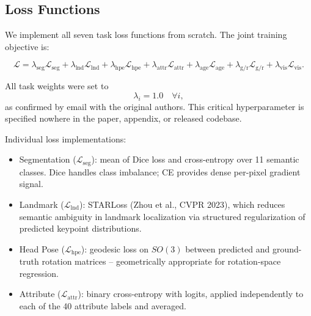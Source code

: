 \documentclass[11pt]{article}
\newenvironment{keybox}[1]{\begin{tcolorbox}[colback=facexlight,colframe=facexteal,title=#1,fonttitle=\bfseries,arc=1mm,boxrule=0.5pt]}{\end{tcolorbox}}
\begin{document}
\subsection{Loss Functions}

We implement all seven task loss functions from scratch. The joint training objective is:

\begin{equation}
\mathcal{L}
= \lambda_{\mathrm{seg}}\mathcal{L}_{\mathrm{seg}}
+ \lambda_{\mathrm{lnd}}\mathcal{L}_{\mathrm{lnd}}
+ \lambda_{\mathrm{hpe}}\mathcal{L}_{\mathrm{hpe}}
+ \lambda_{\mathrm{attr}}\mathcal{L}_{\mathrm{attr}}
+ \lambda_{\mathrm{age}}\mathcal{L}_{\mathrm{age}}
+ \lambda_{\mathrm{g/r}}\mathcal{L}_{\mathrm{g/r}}
+ \lambda_{\mathrm{vis}}\mathcal{L}_{\mathrm{vis}} .
\end{equation}

\begin{keybox}{Key Finding}
All task weights were set to
\[
\lambda_i = 1.0 \quad \forall i ,
\]
as confirmed by email with the original authors. This critical hyperparameter is specified nowhere in the paper, appendix, or released codebase.
\end{keybox}

Individual loss implementations:

\begin{itemize}\item Segmentation ($\mathcal{L}_{\mathrm{seg}}$): mean of Dice loss and cross-entropy over 11 semantic classes. Dice handles class imbalance; CE provides dense per-pixel gradient signal.\end{itemize}

\begin{itemize}\item Landmark ($\mathcal{L}_{\mathrm{lnd}}$): STARLoss (Zhou et al., CVPR 2023), which reduces semantic ambiguity in landmark localization via structured regularization of predicted keypoint distributions.\end{itemize}

\begin{itemize}\item Head Pose ($\mathcal{L}_{\mathrm{hpe}}$): geodesic loss on $SO(3)$ between predicted and ground-truth rotation matrices -- geometrically appropriate for rotation-space regression.\end{itemize}

\begin{itemize}\item Attribute ($\mathcal{L}_{\mathrm{attr}}$): binary cross-entropy with logits, applied independently to each of the 40 attribute labels and averaged.\end{itemize}
\end{document}
